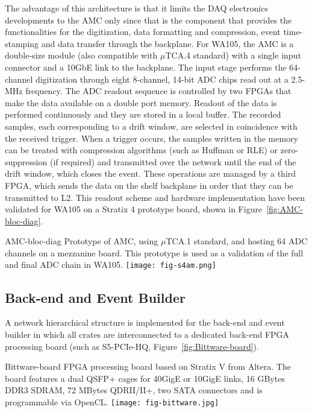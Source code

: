 The advantage of this architecture is that it limits the DAQ electronics
developments to the AMC only since that is the component that provides
the functionalities for the digitization, data formatting and
compression, event time-stamping and data transfer through the
backplane. For WA105, the AMC is a double-size module (also compatible
with $\mu$TCA.4 standard) with a single input connector and a 10GbE
link to the backplane. The input stage performs the 64-channel
digitization through eight 8-channel, 14-bit ADC chips read out at a
2.5-MHz frequency. The ADC readout sequence is controlled by two FPGAs
that make the data available on a double port memory. Readout of the
data is performed continuously and they are stored in a local
buffer. The recorded samples, each corresponding to a drift window, are
selected in coincidence with the received trigger. When a trigger
occurs, the samples written in the memory can be treated with
compression algorithms (such as Huffman or RLE) or zero-suppression
(if required) and transmitted over the network until the end of the
drift window, which closes the event. These operations are managed by a
third FPGA, which sends the data on the shelf backplane in order that they can be transmitted to L2.  
This readout scheme and hardware implementation have been validated for WA105 on a
Stratix 4 prototype board, shown in Figure~\ref{fig:AMC-bloc-diag}.


\begin{cdrfigure}{AMC-bloc-diag}
{\small Prototype of AMC, using $\mu$TCA.1 standard, and hosting 
64 ADC channels on a mezzanine board. This prototype is used as a validation 
of the full and final ADC chain in WA105.}
\texttt{[image: fig-s4am.png]}
\end{cdrfigure}

\subsection{Back-end and Event Builder}


A network hierarchical structure is implemented for the back-end and event builder in which all crates are
interconnected to a dedicated back-end FPGA processing board (such as
S5-PCIe-HQ, Figure~\ref{fig:Bittware-board}).

\begin{cdrfigure}{Bittware-board}
{\small FPGA processing board based on Stratix V from Altera. The board 
features a dual QSFP+ cages for 40GigE or 10GigE links, 16 GBytes DDR3 SDRAM, 
72 MBytes QDRII/II+, two SATA connectors and is programmable via OpenCL.}
\texttt{[image: fig-bittware.jpg]}
\end{cdrfigure}

